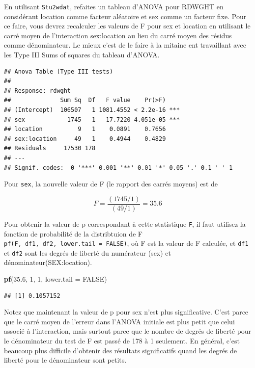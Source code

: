 \documentclass[
  12pt,
]{book}
\newenvironment{Shaded}{\begin{snugshade}}{\end{snugshade}}
\newcommand{\DataTypeTok}[1]{\textcolor[rgb]{0.13,0.29,0.53}{#1}}
\newcommand{\DecValTok}[1]{\textcolor[rgb]{0.00,0.00,0.81}{#1}}
\newcommand{\FloatTok}[1]{\textcolor[rgb]{0.00,0.00,0.81}{#1}}
\newcommand{\KeywordTok}[1]{\textcolor[rgb]{0.13,0.29,0.53}{\textbf{#1}}}
\newcommand{\NormalTok}[1]{#1}
\newcommand{\OtherTok}[1]{\textcolor[rgb]{0.56,0.35,0.01}{#1}}
\begin{document}
En utilisant \texttt{Stu2wdat}, refaites un tableau d'ANOVA pour RDWGHT en considérant location comme facteur aléatoire et sex comme un facteur fixe. Pour ce faire, vous devrez recalculer les valeurs de F pour sex et location en utilisant le carré moyen de l'interaction sex:location au lieu du carré moyen des résidus comme dénominateur. Le mieux c'est de le faire à la mitaine ent travaillant avec les Type III Sums of squares du tableau d'ANOVA.

\begin{verbatim}
## Anova Table (Type III tests)
## 
## Response: rdwght
##              Sum Sq  Df   F value    Pr(>F)    
## (Intercept)  106507   1 1081.4552 < 2.2e-16 ***
## sex            1745   1   17.7220 4.051e-05 ***
## location          9   1    0.0891    0.7656    
## sex:location     49   1    0.4944    0.4829    
## Residuals     17530 178                        
## ---
## Signif. codes:  0 '***' 0.001 '**' 0.01 '*' 0.05 '.' 0.1 ' ' 1
\end{verbatim}

Pour \texttt{sex}, la nouvelle valeur de F (le rapport des carrés moyens) est de

\[F = \frac{(1745/1)}{(49/1)} = 35.6\]

Pour obtenir la valeur de p correspondant à cette statistique \texttt{F}, il faut utilisez la fonction de probabilité de la distribtuion de F \texttt{pf(F,\ df1,\ df2,\ lower.tail\ =\ FALSE)}, où F est la valeur de F calculée, et \texttt{df1} et \texttt{df2} sont les degrés de liberté du numérateur (sex) et dénominateur(SEX:location).

\begin{Shaded}
\begin{Highlighting}[]
\KeywordTok{pf}\NormalTok{(}\FloatTok{35.6}\NormalTok{, }\DecValTok{1}\NormalTok{, }\DecValTok{1}\NormalTok{, }\DataTypeTok{lower.tail =} \OtherTok{FALSE}\NormalTok{)}
\end{Highlighting}
\end{Shaded}

\begin{verbatim}
## [1] 0.1057152
\end{verbatim}

Notez que maintenant la valeur de p pour sex n'est plus significative. C'est parce que le carré moyen de l'erreur dans l'ANOVA initiale est plus petit que celui associé à l'interaction, mais surtout parce que le nombre de degrés de liberté pour le dénominateur du test de F est passé de 178 à 1 seulement. En général, c'est beaucoup plus difficile d'obtenir des résultats significatifs quand les degrés de liberté pour le dénominateur sont petits.
\end{document}
